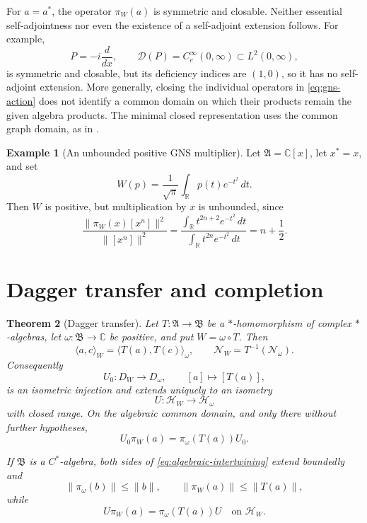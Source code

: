 \documentclass[11pt]{article}
\newtheorem{theorem}{Theorem}[section]
\theoremstyle{definition}
\newtheorem{example}[theorem]{Example}
\theoremstyle{remark}
\numberwithin{equation}{section}
\newcommand{\cN}{\mathcal N}
\newcommand{\R}{\mathbb R}
\newcommand{\C}{\mathbb C}
\begin{document}
For $a=a^*$, the operator $\pi_W(a)$ is symmetric and closable.  Neither
essential self-adjointness nor even the existence of a self-adjoint
extension follows.  For example,
\[
 P=-i\frac{d}{dx},\qquad \mathcal D(P)=C_c^\infty(0,\infty)
 \subset L^2(0,\infty),
\]
is symmetric and closable, but its deficiency indices are $(1,0)$, so it
has no self-adjoint extension.  More generally, closing the individual
operators in \eqref{eq:gns-action} does not identify a common domain on
which their products remain the given algebra products.  The minimal
closed representation uses the common graph domain, as in
\cite[Definition~2.4 and Lemma~2.6]{Powers1971}.

\begin{example}[An unbounded positive GNS multiplier]
Let $\mathfrak A=\C[x]$, let $x^*=x$, and set
\[
 W(p)=\frac1{\sqrt\pi}\int_{\R}p(t)e^{-t^2}\,dt.
\]
Then $W$ is positive, but multiplication by $x$ is unbounded, since
\[
 \frac{\|\pi_W(x)[x^n]\|^2}{\|[x^n]\|^2}
 =\frac{\int_{\R}t^{2n+2}e^{-t^2}\,dt}
        {\int_{\R}t^{2n}e^{-t^2}\,dt}
 =n+\frac12.
\]
\end{example}

\section{Dagger transfer and completion}

\begin{theorem}[Dagger transfer]
Let $T:\mathfrak A\to\mathfrak B$ be a $*$-homomorphism of complex
$*$-algebras, let $\omega:\mathfrak B\to\C$ be positive, and put
$W=\omega\circ T$.  Then
\begin{equation}
 \langle a,c\rangle_W
 =\langle T(a),T(c)\rangle_\omega,
 \qquad
 \cN_W=T^{-1}(\cN_\omega).
 \label{eq:pullback}
\end{equation}
Consequently
\begin{equation}
 U_0:D_W\longrightarrow D_\omega,
 \qquad [a]\longmapsto[T(a)],
 \label{eq:gns-map}
\end{equation}
is an isometric injection and extends uniquely to an isometry
\begin{equation}
 U:\mathcal H_W\longrightarrow\mathcal H_\omega
 \label{eq:completion-map}
\end{equation}
with closed range.  On the algebraic common domain, and only there
without further hypotheses,
\begin{equation}
 U_0\pi_W(a)=\pi_\omega(T(a))U_0.
 \label{eq:algebraic-intertwining}
\end{equation}

If $\mathfrak B$ is a $C^*$-algebra, both sides of
\eqref{eq:algebraic-intertwining} extend boundedly and
\begin{equation}
 \|\pi_\omega(b)\|\leq\|b\|,
 \qquad
 \|\pi_W(a)\|\leq\|T(a)\|,
 \label{eq:cstar-bounds}
\end{equation}
while
\begin{equation}
 U\pi_W(a)=\pi_\omega(T(a))U
 \quad\text{on }\mathcal H_W.
 \label{eq:bounded-intertwining}
\end{equation}
\end{theorem}
\end{document}
